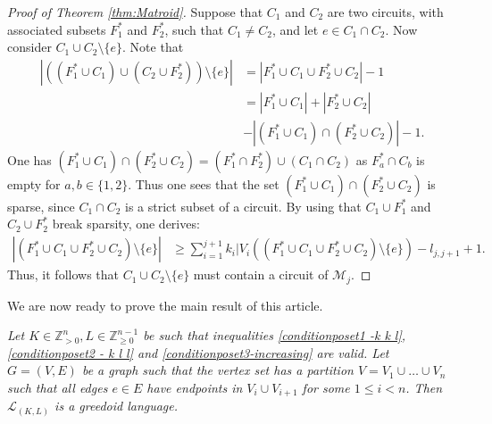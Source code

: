 \documentclass{article}
\begin{document}
\begin{proof}[Proof of Theorem \ref{thm:Matroid}]
Suppose that $C_1$ and $C_2$ are two circuits, with associated subsets $F_1^{*}$ and $F_2^{*}$, such that $C_1 \neq C_2$, and let $e \in C_1 \cap C_2$. Now consider $C_1 \cup C_2 \setminus \{e\}$. Note that 
\begin{align*}
|\left((F_1^* \cup C_1) \cup (C_2 \cup F_2^*)\right) \setminus \{e\}|&=|F_1^* \cup C_1 \cup F_2^{*}  \cup C_2|-1\\
& = |F_1^* \cup C_1| + |F_2^* \cup C_2| \\
&- |\left(F_1^* \cup C_1\right) \cap \left( F_2^* \cup C_2\right)| -1.
\end{align*}
One has $\left(F_1^* \cup C_1\right) \cap \left( F_2^* \cup C_2\right) = \left(F_1^* \cap F_2^{*}\right) \cup \left( C_1 \cap C_2\right)$ as $F_{a}^{*} \cap C_{b}$ is empty for $a,b\in \{1, 2\}$. Thus one sees that the set $\left(F_1^* \cup C_1\right) \cap \left( F_2^* \cup C_2\right)$ is sparse, since $C_1\cap C_2$ is a strict subset of a circuit. By using that $C_1 \cup F_1^{*}$  and $C_2 \cup F_2^{*}$ break sparsity, one derives:
\begin{align*}
    |\left(F_1^* \cup C_1 \cup F_2^{*} \cup C_2\right) \setminus \{e\}| &\geq \sum_{i=1}^{j+1} k_i|V_i\left(\left(F_1^{*} \cup C_1 \cup F_2^{*} \cup C_2 \right) \setminus \{e\}\right) -l_{j, j+1} + 1.
\end{align*}
Thus, it follows that $C_1 \cup C_2 \setminus \{e\}$ must contain a circuit of $\mathcal{M}_j$.
\end{proof}

We are now ready to prove the main result of this article. 

\medskip
{} {\em Let $K\in \mathbb{Z}_{>0}^{n}, L\in \mathbb{Z}_{\geq 0}^{n-1}$ be such that inequalities \eqref{conditionposet1 -k k l}, \eqref{conditionposet2 - k l l} and \eqref{conditionposet3-increasing} are valid. Let $G=(V,E)$ be a graph such that the vertex set has a partition $V=V_1\cup \dots \cup V_n$ such that all edges $e\in E$ have endpoints in $V_{i} \cup V_{i+1}$ for some $1 \leq i < n$. Then $\mathcal{L}_{(K,L)}$ is a greedoid language.}
\medskip
\end{document}
